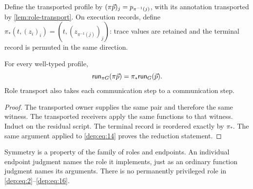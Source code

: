 Define the transported profile by $(\pi\vec p)_j=p_{\pi^{-1}(j)}$, with its
annotation transported by \cref{lem:role-transport}. On execution records,
define $\pi_*(t,(z_i)_i)=(t,(z_{\pi^{-1}(j)})_j)$: trace values are retained
and the terminal record is permuted in the same direction.

\begin{lemma}[Equivariance]
\label{thm:equivariance}
For every well-typed profile,
\begin{equation}
 \mathsf{run}_{\pi G}(\pi\vec p)=\pi_*\mathsf{run}_G(\vec p).
 \label{dep:eq:16}
\end{equation}
Role transport also takes each communication step to a communication step.
\end{lemma}
\begin{proof}
The transported owner supplies the same pair and therefore the same witness.
The transported receivers apply the same functions to that witness. Induct on
the residual script. The terminal record is reordered exactly by $\pi_*$.
The same argument applied to \eqref{dep:eq:14} proves the reduction statement.
\end{proof}

Symmetry is a property of the family of roles and endpoints. An individual
endpoint judgment names the role it implements, just as an ordinary function
judgment names its arguments. There is no permanently privileged role in
\eqref{dep:eq:2}--\eqref{dep:eq:16}.

